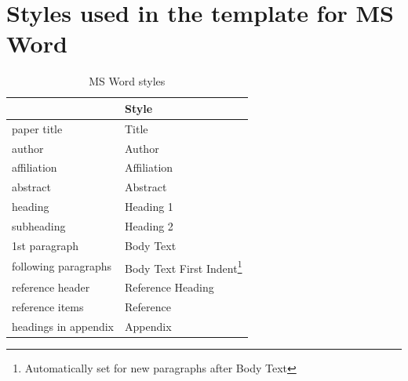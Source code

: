 \documentclass[10pt,twocolumn]{conference}
\begin{document}
\section{Styles used in the template for MS Word}
\begin{savenotes}
\begin{table}[htb]
\caption{MS Word styles}
\centering
\begin{tabular}{|p{35mm}|p{35mm}|}
\hline
 & Style \\
\hline
paper title & Title \\
\hline
author & Author \\
\hline
affiliation & Affiliation \\
\hline
abstract & Abstract \\
\hline
heading & Heading 1 \\
\hline
subheading & Heading 2 \\
\hline
1st paragraph & Body Text \\
\hline
following paragraphs & Body Text First Indent\footnote{Automatically set for new paragraphs after Body Text} \\
\hline
reference header & Reference Heading \\
\hline
reference items & Reference \\
\hline
headings in appendix & Appendix \\
\hline
\end{tabular}
\end{table}
\end{savenotes}
\end{document}
